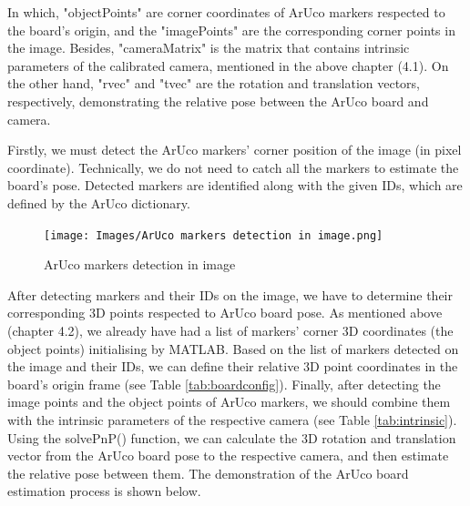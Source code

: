 In which, "objectPoints" are corner coordinates of ArUco markers respected to the board's origin, and the "imagePoints" are the corresponding corner points in the image. Besides, "cameraMatrix" is the matrix that contains intrinsic parameters of the calibrated camera, mentioned in the above chapter (4.1). On the other hand, "rvec" and "tvec" are the rotation and translation vectors, respectively, demonstrating the relative pose between the ArUco board and camera.

Firstly, we must detect the ArUco markers' corner position of the image (in pixel coordinate). Technically, we do not need to catch all the markers to estimate the board's pose. Detected markers are identified along with the given IDs, which are defined by the ArUco dictionary.

\begin{figure}[ht]
\centering
\texttt{[image: Images/ArUco markers detection in image.png]}
\caption{ArUco markers detection in image}
\end{figure}

After detecting markers and their IDs on the image, we have to determine their corresponding 3D points respected to ArUco board pose. As mentioned above (chapter 4.2), we already have had a list of markers' corner 3D coordinates (the object points) initialising by MATLAB. Based on the list of markers detected on the image and their IDs, we can define their relative 3D point coordinates in the board's origin frame (see Table \ref{tab:boardconfig}). Finally, after detecting the image points and the object points of ArUco markers, we should combine them with the intrinsic parameters of the respective camera (see Table \ref{tab:intrinsic}). Using the solvePnP() function, we can calculate the 3D rotation and translation vector from the ArUco board pose to the respective camera, and then estimate the relative pose between them. The demonstration of the ArUco board estimation process is shown below.

